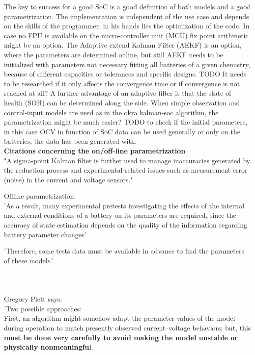 The key to success for a good SoC is a good definition of both models and a good parametrization. The implementation is independent of the use case and depends on the skills of the programmer, in his  hands lies the optimization of the  code. In case no FPU is available on the micro-controller unit (MCU) fix point arithmetic might be an option. 
The Adaptive extend Kalman Filter (AEKF) is an option, where the parameters are determined online, but still AEKF needs to be initialized with parameters not necessary fitting all batteries of a given chemistry, because of different capacities or tolerances and specific designs. 
TODO It needs to be researched if it only affects the convergence time or if convergence is not reached at all? A further advantage of an adaptive filter is that the state of health (SOH) can be determined along the side. 
When simple observation and control-input models are used as in the okra kalman-soc algorithm, the parametrization might be much easier?
TODO to check if the initial parameters, in this case OCV in function of SoC data can be used generally or only on the batteries, the data has been generated with. \\

\textbf{Citations concerning the on/off-line parametrization} \\

"A sigma-point Kalman filter is further used to manage inaccuracies generated by the reduction process and experimental-related issues such as measurement error (noise) in the current and voltage sensors."


Offline parametrization: \\
'As a result, many experimental pretests investigating the
effects of the internal and external conditions of a battery on its parameters are required, since the
accuracy of state estimation depends on the quality of the information regarding battery parameter
changes'

'Therefore, some tests data must be available in 
advance to find the parameters of these models.'
\cite{hussein2011overview}  \\ \\ \\ \\

Gregory Plett says: \\
'Two possible approaches: \\

First, an algorithm might somehow adapt the parameter values of the model during operation to match presently observed current–voltage behaviors; but, this \textbf{must be done very carefully to avoid making the model unstable or physically nonmeaningful}. \\


